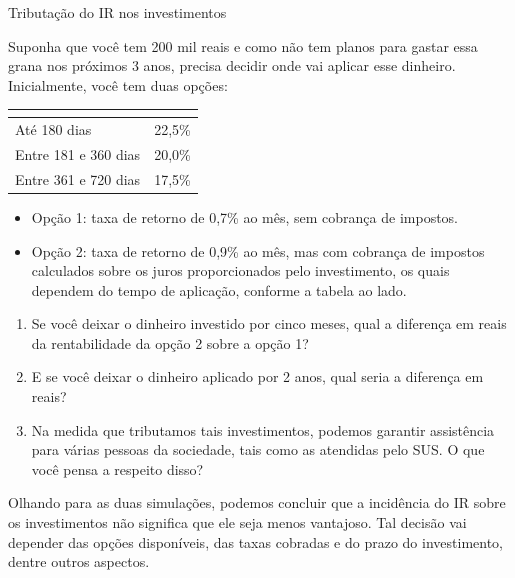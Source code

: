\begin{task}{Tributação do IR nos investimentos}
\label{fin-ativ-36}

Suponha que você tem 200 mil reais e como não tem planos para gastar essa grana nos próximos 3 anos, precisa decidir onde vai aplicar esse dinheiro. Inicialmente, você tem duas opções:

\begin{table}[H]
\centering
\begin{tabu} to \textwidth{|l|l|}
\hline
{} &  \\
\hline
Até 180 dias & 22,5\% \\
\hline
Entre 181 e 360 dias & 20,0\% \\
\hline
Entre 361 e 720 dias & 17,5\% \\
\hline
\end{tabu}
\end{table}

\begin{itemize}
\item Opção 1: taxa de retorno de 0,7\% ao mês, sem cobrança de impostos.
\item Opção 2: taxa de retorno de 0,9\% ao mês, mas com cobrança de impostos calculados sobre os juros proporcionados pelo investimento, os quais dependem do tempo de aplicação, conforme a tabela ao lado.
\end{itemize}

\begin{enumerate}
\item Se você deixar o dinheiro investido por cinco meses, qual a diferença em reais da rentabilidade da opção 2 sobre a opção 1?
\item E se você deixar o dinheiro aplicado por 2 anos, qual seria a diferença em reais?
\item Na medida que tributamos tais investimentos, podemos garantir assistência para várias pessoas da sociedade, tais como as atendidas pelo SUS. O que você pensa a respeito disso?
\end{enumerate}

Olhando para as duas simulações, podemos concluir que a incidência do IR sobre os investimentos não significa que ele seja menos vantajoso. Tal decisão vai depender das opções disponíveis, das taxas cobradas e do prazo do investimento, dentre outros aspectos.
\end{task}


